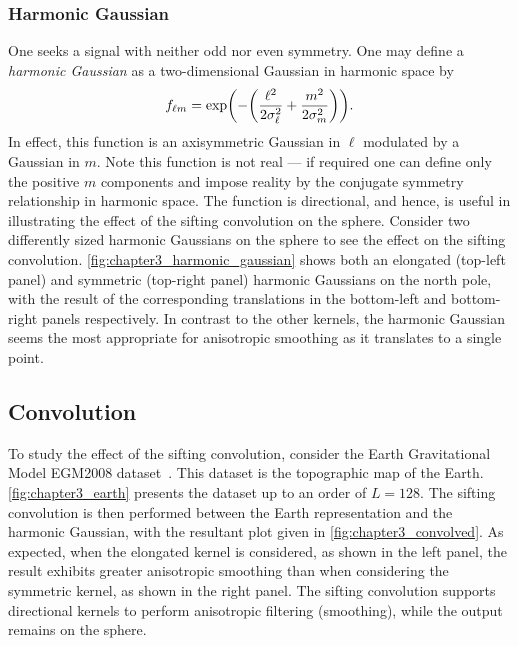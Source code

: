 \subsubsection{Harmonic Gaussian}

One seeks a signal with neither odd nor even symmetry.
One may define a \emph{harmonic Gaussian} as a two-dimensional Gaussian in harmonic space by
%
\begin{equation}\label{eq:chapter3_harmonic_gaussian}
	{f}_{\ell m}
	= \exp(-\bigg(\frac{{\ell}^{2}}{2\sigma_{\ell}^{2}} + \frac{{m}^{2}}{2\sigma_{m}^{2}}\bigg)).
\end{equation}
%
In effect, this function is an axisymmetric Gaussian in \(\ell{}\) modulated by a Gaussian in \(m\).
Note this function is not real --- if required one can define only the positive \(m\) components and impose reality by the conjugate symmetry relationship in harmonic space.
The function is directional, and hence, is useful in illustrating the effect of the sifting convolution on the sphere.
Consider two differently sized harmonic Gaussians on the sphere to see the effect on the sifting convolution.
\cref{fig:chapter3_harmonic_gaussian} shows both an elongated (top-left panel) and symmetric (top-right panel) harmonic Gaussians on the north pole, with the result of the corresponding translations in the bottom-left and bottom-right panels respectively.
In contrast to the other kernels, the harmonic Gaussian seems the most appropriate for anisotropic smoothing as it translates to a single point.



\subsection{Convolution}\label{sec:chapter3_convolution}

To study the effect of the sifting convolution, consider the Earth Gravitational Model EGM2008 dataset~\cite{Pavlis2013}.
This dataset is the topographic map of the Earth.
\cref{fig:chapter3_earth} presents the dataset up to an order of \(L=128\).
The sifting convolution is then performed between the Earth representation and the harmonic Gaussian, with the resultant plot given in \cref{fig:chapter3_convolved}.
As expected, when the elongated kernel is considered, as shown in the left panel, the result exhibits greater anisotropic smoothing than when considering the symmetric kernel, as shown in the right panel.
The sifting convolution supports directional kernels to perform anisotropic filtering (smoothing), while the output remains on the sphere.

